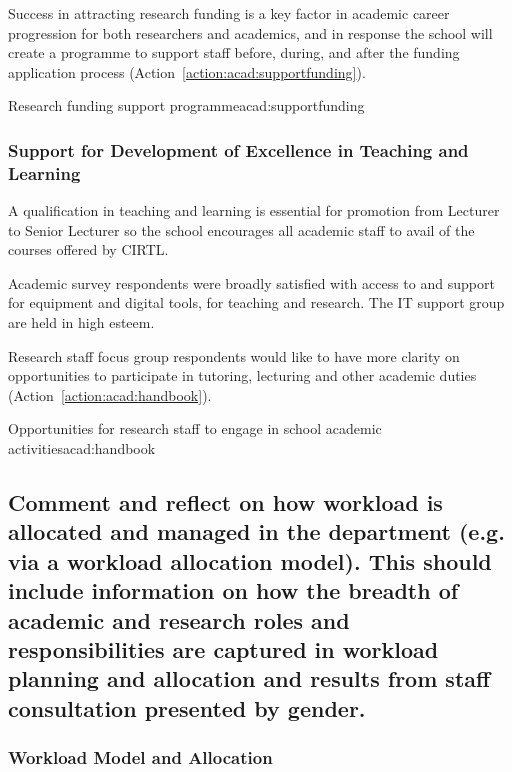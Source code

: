 Success in attracting research funding is a key factor in academic career progression for both researchers and academics, and in response the school will create a programme to support staff before, during, and after the funding application process (Action~\ref{action:acad:supportfunding}). 


\begin{actionblock}{\ksspace{}Research funding support programme}{acad:supportfunding}
\actsupportprogramme
\hfill{
    \hypersetup{hidelinks}
    \hyperlink{c16}{\gotoactionsymbol{}}
}
\end{actionblock}



\subsubsection{Support for Development of Excellence in Teaching and Learning}

A qualification in teaching and learning is essential for promotion from Lecturer to Senior Lecturer so the school encourages all academic staff to avail of the courses offered by \ac{CIRTL}.

Academic survey respondents  were broadly satisfied with access to and support for equipment and digital tools, for teaching and research. The IT support group are held in high esteem. 

Research staff focus group respondents would like to have more clarity on opportunities to participate in tutoring, lecturing and other academic duties (Action~\ref{action:acad:handbook}).

\begin{actionblock}{\ksspace{}Opportunities for research staff to engage in school academic activities}{acad:handbook}
\acthandbook
\hfill{
    \hypersetup{hidelinks}
    \hyperlink{cxx1}{\gotoactionsymbol{}}
}
\end{actionblock}


\subsection{Comment and reflect on how workload is allocated and managed in the department (e.g. via a workload allocation model). This should include information on how the breadth of academic and research roles and responsibilities are captured in workload planning and allocation and results from staff consultation presented by gender.}\label{sub:workload}


\subsubsection{Workload Model and Allocation}

